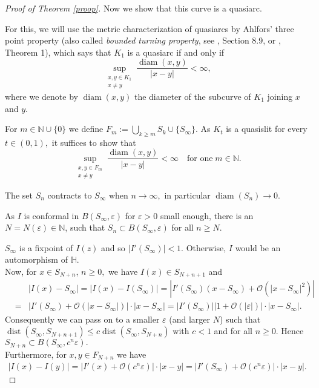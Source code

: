 \documentclass[11pt]{amsart}
\numberwithin{equation}{section}
\theoremstyle{plain}
\theoremstyle{definition}
\begin{document}
\begin{proof}[Proof of Theorem \ref{proop}]
Now we show that this curve is a quasiarc.

For this, we will use the metric characterization of quasiarcs by Ahlfors' three point property (also called \emph{bounded turning property}, see \cite{MR0344463}, Section 8.9, or \cite{MR0210889}, Theorem 1), which says that $K_1$ is a quasiarc if and only if 
$$ \sup_{
\substack{x,y \in K_1 \\ x\not=y}} \frac{{\operatorname{diam}}(x,y)}{|x-y|} < \infty,$$ 
where we denote by ${\operatorname{diam}}(x,y)$ the diameter of the subcurve of $K_1$ joining $x$ and $y.$

For $m\in{\mathbb N}\cup\{0\}$ we define $F_m:=\bigcup_{k\geq m}S_{k}\cup\{S_\infty\}$. As $K_t$ is a quasislit for every $t\in(0,1),$ it suffices to show that 
\begin{equation}\label{show}
 \sup_{
\substack{x,y \in F_m \\ x\not=y}} \frac{{\operatorname{diam}}(x,y)}{|x-y|} < \infty \quad \text{for one} \; m \in{\mathbb N}.
\end{equation}

The set $S_n$ contracts to $S_\infty$ when $n\to\infty,$ in particular ${\operatorname{diam}}(S_n)\to0.$ 

As $I$ is conformal in $B(S_\infty, {\varepsilon})$ for ${\varepsilon}>0$ small enough, there is an $N=N({\varepsilon})\in{\mathbb N}$, such that 
$S_n\subset B(S_\infty, {\varepsilon})$ for all $n\geq N$. 

$S_\infty$ is a fixpoint of $I(z)$ and so $|I'(S_\infty)|<1.$ Otherwise, $I$ would be an automorphism of ${\mathbb H}.$\\

Now, for $x\in S_{N+n}$, $n\geq 0,$ we have $I(x)\in S_{N+n+1}$ and
 \begin{eqnarray*}
 &&|I(x)-S_\infty|=|I(x)-I(S_\infty)|=|I'(S_\infty)(x-S_\infty)+{\mathcal{O}}(|x-S_\infty|^2)|\\&=&
|I'(S_\infty)+{\mathcal{O}}(|x-S_\infty|)|\cdot|x-S_\infty|=|I'(S_\infty)||1+{\mathcal{O}}(|{\varepsilon}|)|\cdot|x-S_\infty|.
\end{eqnarray*} Consequently we can pass on to a smaller ${\varepsilon}$ (and larger $N$) such that ${\operatorname{dist}}(S_\infty, S_{N+n+1})\leq c{\operatorname{dist}}(S_\infty, S_{N+n})$ with $c<1$ and for all $n\geq0$. Hence 
$S_{N+n}\subset B(S_\infty,c^n{\varepsilon}).$\\

Furthermore, for $x,y\in F_{N+n}$ we have
\begin{eqnarray*}
 |I(x)-I(y)|= |I'(x)+{\mathcal{O}}(c^n{\varepsilon})|\cdot|x-y|=|I'(S_\infty)+{\mathcal{O}}(c^n{\varepsilon})|\cdot|x-y|.
\end{eqnarray*}


\end{proof}
\end{document}

